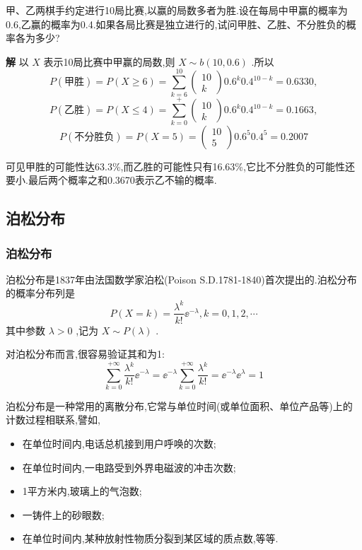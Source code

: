 \begin{example}\label{exam:2.4.3}
	甲、乙两棋手约定进行10局比赛,以赢的局数多者为胜.设在每局中甲赢的概率为0.6,乙赢的概率为0.4.如果各局比赛是独立进行的,试问甲胜、乙胜、不分胜负的概率各为多少?
	
	\textbf{解} 以 $ X $ 表示10局比赛中甲赢的局数,则 $ X \sim b(10,0.6) $ .所以
	\[
	P(\text{甲胜})= P(X \geqslant 6)=\sum_{k=6}^{10} \left( 
	\begin{array}{l}{10} \\ 
	{k}
	\end{array}
	\right) 
	0.6^{k} 0.4^{10-k}=0.6330 ,
	\]
	\[
	P(\text{乙胜}) =P(X \leqslant 4)=\sum_{k=0}^{+} \left( 
	\begin{array}{c}{10} \\ 
	{k}
	\end{array}
	\right) 
	0.6^{k} 0.4^{10-k}=0.1663 ,
	\]
	\[
	P(\text{不分胜负})=P(X=5)=\left( \begin{array}{c}{10} \\ {5}\end{array}\right) 0.6^{5} 0.4^{5}=0.2007
	\]
	
	可见甲胜的可能性达63.3\%,而乙胜的可能性只有16.63\%,它比不分胜负的可能性还要小.最后两个概率之和0.3670表示乙不输的概率.
\end{example}

\subsection{泊松分布}\label{ssec:2.4.2}

\subsubsection{泊松分布}

泊松分布是1837年由法国数学家泊松(Poison S.D.1781-1840)首次提出的.泊松分布的概率分布列是
\begin{equation}
P(X=k)=\frac{\lambda^{k}}{k !} \ee ^{-\lambda}, k=0,1,2, \cdots \label{eq:2.4.3}
\end{equation}
其中参数 $ \lambda >0 $ ,记为 $ X \sim P(\lambda) $ .

对泊松分布而言,很容易验证其和为1:
\[
\sum_{k=0}^{+\infty} \frac{\lambda^{k}}{k !} \ee ^{-\lambda}=\ee ^{-\lambda} \sum_{k=0}^{+\infty} \frac{\lambda^{k}}{k !}=\ee ^{-\lambda} \ee ^{\lambda}=1
\]

泊松分布是一种常用的离散分布,它常与单位时间(或单位面积、单位产品等)上的计数过程相联系,譬如,
\begin{itemize}
	\item 在单位时间内,电话总机接到用户呼唤的次数;
	\item 在单位时间内,一电路受到外界电磁波的冲击次数;
	\item 1平方米内,玻璃上的气泡数;
	\item 一铸件上的砂眼数;
	\item 在单位时间内,某种放射性物质分裂到某区域的质点数,等等.
\end{itemize}

